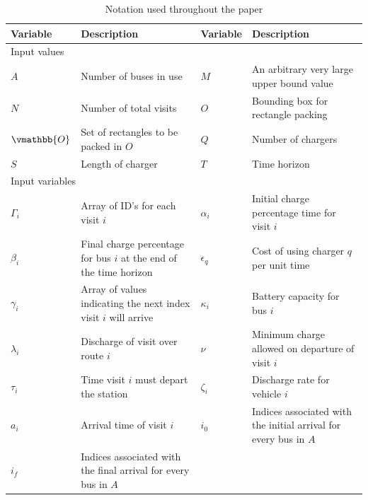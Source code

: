 \documentclass[letterpaper, 10pt, conference]{IEEEtran}
\begin{document}
\begin{table}[!t]
	\caption{Notation used throughout the paper}
	\label{tab:variables}
	\centering
	\begin{tabular}{l l l l}
		\toprule
		\textbf{Variable} & \textbf{Description} & \textbf{Variable} & \textbf{Description} \\
		\toprule
		\multicolumn{4}{l}{Input values}                                  \\
			$A$           & Number of buses in use                    &
			$M$           & An arbitrary very large upper bound value \\
			$N$           & Number of total visits                    &
			$O$           & Bounding box for rectangle packing        \\
			$\vmathbb{O}$ & Set of rectangles to be packed in $O$     &
			$Q$           & Number of chargers                        \\
			$S$           & Length of charger                         &
			$T$           & Time horizon                              \\
		\hline
		\multicolumn{4}{l}{Input variables} \\
			$\Gamma_i$   & Array of ID's for each visit $i$                                   &
			$\alpha_i$   & Initial charge percentage time for visit $i$                       \\
			$\beta_i$    & Final charge percentage for bus $i$ at the end of the time horizon &
			$\epsilon_q$ & Cost of using charger $q$ per unit time                            \\
			$\gamma_i$   & Array of values indicating the next index visit $i$ will arrive    &
			$\kappa_i$   & Battery capacity for bus $i$                                       \\
			$\lambda_i$  & Discharge of visit over route $i$                                  &
			$\nu$        & Minimum charge allowed on departure of visit $i$                   \\
			$\tau_i$     & Time visit $i$ must depart the station                             &
			$\zeta_i$    & Discharge rate for vehicle $i$                                     \\
			$a_i$        & Arrival time of visit  $i$                                         &
			$i_0$        & Indices associated with the initial arrival for every bus in $A$   \\
			$i_f$        & Indices associated with the final arrival for every bus in $A$     &

\end{tabular}
\end{table}
\end{document}
